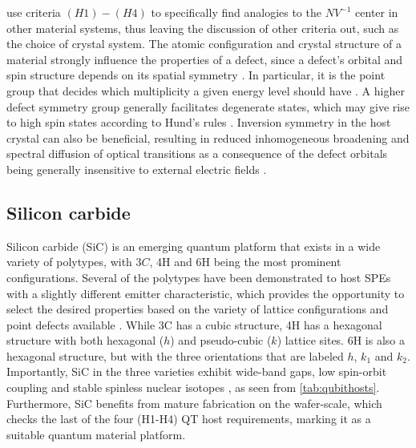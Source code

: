 
\noindent \citeauthor{Weber2010} \cite{Weber2010} use criteria $(H1)-(H4)$ to specifically find analogies to the $NV^{-1}$ center in other material systems, thus leaving the discussion of other criteria out, such as the choice of crystal system. The atomic configuration and crystal structure of a material strongly influence the properties of a defect, since a defect's orbital and spin structure depends on its spatial symmetry \cite{Bassett2019}. In particular, it is the point group that decides which multiplicity a given energy level should have \cite{James1976}. A higher defect symmetry group generally facilitates degenerate states, which may give rise to high spin states according to Hund's rules \cite{Bassett2019, Togan2010}. Inversion symmetry in the host crystal can also be beneficial, resulting in reduced inhomogeneous broadening and spectral diffusion of optical transitions as a consequence of the defect orbitals being generally insensitive to external electric fields \cite{Bassett2019}.

\subsection{Silicon carbide}
\label{silicon-carbide}

Silicon carbide (SiC) is an emerging quantum platform that exists in a wide variety of polytypes, with $3C$, 4H and 6H being the most prominent configurations. Several of the polytypes have been demonstrated to host SPEs with a slightly different emitter characteristic, which provides the opportunity to select the desired properties based on the variety of lattice configurations and point defects available \cite{Weber2010, Son2020, Falk2013}. While 3C has a cubic structure, 4H has a hexagonal structure with both hexagonal ($h$) and pseudo-cubic ($k$) lattice sites. 6H is also a hexagonal structure, but with the three orientations that are labeled $h$, $k_1$ and $k_2$. Importantly, SiC in the three varieties exhibit wide-band gaps, low spin-orbit coupling and stable spinless nuclear isotopes \cite{Neudeck1995, Weber2010, Martienssen2005}, as seen from \autoref{tab:qubithosts}. Furthermore, SiC benefits from mature fabrication on the wafer-scale, which checks the last of the four (H1-H4) QT host requirements, marking it as a suitable quantum material platform.

